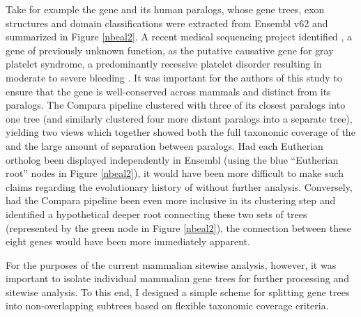 Take for example the gene  and its human paralogs, whose gene
trees, exon structures and domain classifications were extracted from
Ensembl v62 and summarized in Figure \ref{nbeal2}. A recent medical
sequencing project identified , a gene of previously unknown
function, as the putative causative gene for gray platelet syndrome, a
predominantly recessive platelet disorder resulting in moderate to
severe bleeding \citep{Albers2011}. It was important for the
authors of this study to ensure that the  gene is well-conserved
across mammals and distinct from its paralogs. The Compara pipeline
clustered  with three of its closest paralogs into one tree (and
similarly clustered four more distant  paralogs into a separate
tree), yielding two views which together showed both the full
taxonomic coverage of the  \subtr{} and the large amount of
separation between paralogs. Had each Eutherian ortholog been
displayed independently in Ensembl (using the blue ``Eutherian root'' nodes in
Figure \ref{nbeal2}), it would have been more difficult to make such
claims regarding the evolutionary history of  without further
analysis. Conversely, had the Compara pipeline been even more
inclusive in its clustering step and identified a hypothetical deeper
root connecting these two sets of trees (represented by the green node
in Figure \ref{nbeal2}), the connection between these eight genes
would have been more immediately apparent.

For the purposes of the current mammalian sitewise analysis, however,
it was important to isolate individual mammalian gene trees for
further processing and sitewise analysis. To this end, I designed a
simple scheme for splitting gene trees into non-overlapping subtrees
based on flexible taxonomic coverage criteria.

